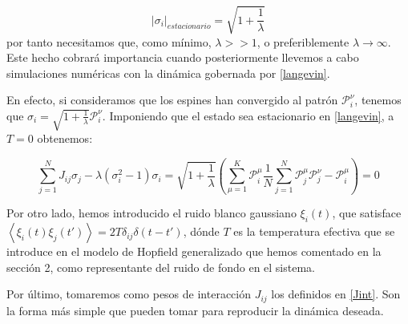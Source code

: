 \documentclass[titlepage,12pt]{article}
\numberwithin{equation}{section}
\begin{document}
	\begin{displaymath}
	|\sigma_i|_{estacionario}=\sqrt{1 + \frac{1}{\lambda}}
	\end{displaymath}
	por tanto necesitamos que, como mínimo, $\lambda >> 1$, o preferiblemente $\lambda\rightarrow\infty$. Este hecho cobrará importancia cuando posteriormente llevemos a cabo simulaciones numéricas con la dinámica gobernada por \eqref{langevin}.

    En efecto, si consideramos que los espines han convergido al patrón $\mathcal{P}^\nu_i$, tenemos que $\sigma_i = \sqrt{1 + \frac{1}{\lambda}} \mathcal{P}^\nu_i$. Imponiendo que el estado sea estacionario en \eqref{langevin}, a $T = 0$ obtenemos:

	\begin{equation*}
	\sum_{j=1}^N J_{ij}\sigma_j - \lambda(\sigma_i^2-1)\sigma_i = \sqrt{1 + \frac{1}{\lambda}} \left( \sum_{\mu=1}^K \mathcal{P}^\mu_i \frac{1}{N} \sum_{j=1}^N \mathcal{P}^\mu_j \mathcal{P}^\nu_j  - \mathcal{P}^\mu_i \right) = 0
	\end{equation*} 
	
	Por otro lado, hemos introducido el ruido blanco gaussiano $\xi_i(t)$, que satisface $\left<\xi_i(t)\xi_j(t')\right>=2T\delta_{ij}\delta(t-t')$, dónde $T$ es la temperatura efectiva que se introduce en el modelo de Hopfield generalizado que hemos comentado en la sección 2, como representante del ruido de fondo en el sistema.
	
	Por último, tomaremos como pesos de interacción $J_{ij}$ los definidos en \eqref{Jint}. Son la forma más simple que pueden tomar para reproducir la dinámica deseada. 
	
\end{document}
